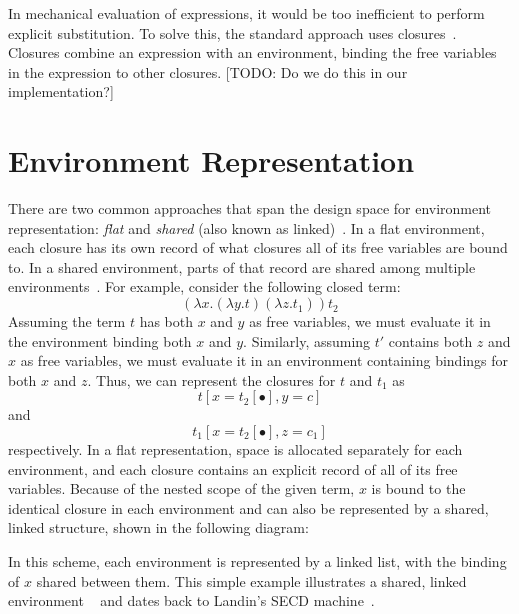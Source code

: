 \documentclass[preprint]{sigplanconf}
\begin{document}
In mechanical evaluation of expressions, it would be too inefficient to perform
explicit substitution. To solve this, the standard approach uses
closures~\cite{landin1964mechanical, curien1991abstract, jonesstg, biernacka2007concrete}.
Closures combine an expression with an environment, binding the free
variables in the expression to other closures.  [TODO: Do we do this
in our implementation?]

\section{Environment Representation} \label{sec:env}

There are two common approaches that span the design space for environment
representation: \emph{flat} and \emph{shared} (also
known as linked)~\cite{appel1988optimizing, shao1994space}. In a flat
environment, each closure has its own record of what closures all
of its free variables are bound to. In a shared environment, parts
of that record are shared among multiple environments~\cite{appel1988optimizing,
shao1994space}. For example, consider the following closed term: $$(\lambda
x.(\lambda y.t) (\lambda z.t_1)) t_2$$ Assuming the term $t$ has both $x$ and
$y$ as free variables, we must evaluate it in the environment binding both $x$
and $y$.  Similarly, assuming $t'$ contains both $z$ and $x$ as free variables,
we must evaluate it in an environment containing bindings for both $x$ and $z$.
Thus, we can represent the closures for $t$ and $t_1$ as
$$t[x=t_2[\bullet], y=c]$$ and $$t_1[x=t_2[\bullet], z=c_1]$$ respectively. In a
flat representation, space is allocated separately for each
environment, and each closure contains
an explicit record of all of its free variables. Because of the nested scope of
the given term, $x$ is bound to the identical closure in each
environment and can also be represented by a shared, linked
structure, shown in the following
diagram:

\begin{center}
\end{center}
In this scheme, each environment is represented by a linked list, with
the binding of $x$ shared between them. This simple example
illustrates a shared, linked environment ~\cite{appel1988optimizing}
and dates back to Landin's SECD machine~\cite{landin1964mechanical}.
\end{document}

